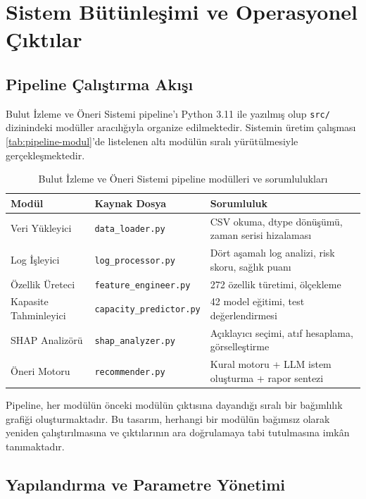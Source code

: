 \section{Sistem Bütünleşimi ve Operasyonel Çıktılar}
\label{sec:sistem-butun}

\subsection{Pipeline Çalıştırma Akışı}

Bulut İzleme ve Öneri Sistemi pipeline'ı Python 3.11 ile yazılmış olup \texttt{src/} dizinindeki modüller aracılığıyla organize edilmektedir.
Sistemin üretim çalışması \autoref{tab:pipeline-modul}'de listelenen altı modülün sıralı yürütülmesiyle gerçekleşmektedir.

\begin{table}[htbp]
    \centering
    \caption{Bulut İzleme ve Öneri Sistemi pipeline modülleri ve sorumlulukları}
    \label{tab:pipeline-modul}
    \begin{tabular}{p{3.5cm}p{4.0cm}p{5.5cm}}
        \textbf{Modül} & \textbf{Kaynak Dosya} & \textbf{Sorumluluk} \\
        \hline
        Veri Yükleyici      & \texttt{data\_loader.py}        & CSV okuma, dtype dönüşümü, zaman serisi hizalaması \\
        Log İşleyici        & \texttt{log\_processor.py}      & Dört aşamalı log analizi, risk skoru, sağlık puanı \\
        Özellik Üreteci     & \texttt{feature\_engineer.py}   & 272 özellik türetimi, ölçekleme \\
        Kapasite Tahminleyici & \texttt{capacity\_predictor.py} & 42 model eğitimi, test değerlendirmesi \\
        SHAP Analizörü      & \texttt{shap\_analyzer.py}      & Açıklayıcı seçimi, atıf hesaplama, görselleştirme \\
        Öneri Motoru        & \texttt{recommender.py}         & Kural motoru + LLM istem oluşturma + rapor sentezi \\
    \end{tabular}
\end{table}

Pipeline, her modülün önceki modülün çıktısına dayandığı sıralı bir bağımlılık grafiği oluşturmaktadır.
Bu tasarım, herhangi bir modülün bağımsız olarak yeniden çalıştırılmasına ve çıktılarının ara doğrulamaya tabi tutulmasına imkân tanımaktadır.

\subsection{Yapılandırma ve Parametre Yönetimi}


